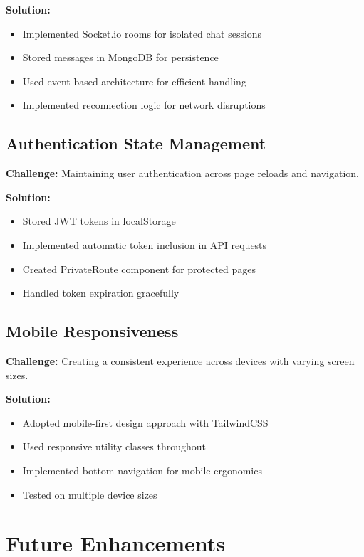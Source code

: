 \documentclass[12pt,a4paper]{article}
\begin{document}
\textbf{Solution:}
\begin{itemize}
    \item Implemented Socket.io rooms for isolated chat sessions
    \item Stored messages in MongoDB for persistence
    \item Used event-based architecture for efficient handling
    \item Implemented reconnection logic for network disruptions
\end{itemize}

\subsection{Authentication State Management}

\textbf{Challenge:} Maintaining user authentication across page reloads and navigation.

\textbf{Solution:}
\begin{itemize}
    \item Stored JWT tokens in localStorage
    \item Implemented automatic token inclusion in API requests
    \item Created PrivateRoute component for protected pages
    \item Handled token expiration gracefully
\end{itemize}

\subsection{Mobile Responsiveness}

\textbf{Challenge:} Creating a consistent experience across devices with varying screen sizes.

\textbf{Solution:}
\begin{itemize}
    \item Adopted mobile-first design approach with TailwindCSS
    \item Used responsive utility classes throughout
    \item Implemented bottom navigation for mobile ergonomics
    \item Tested on multiple device sizes
\end{itemize}

\newpage

\section{Future Enhancements}
\end{document}
